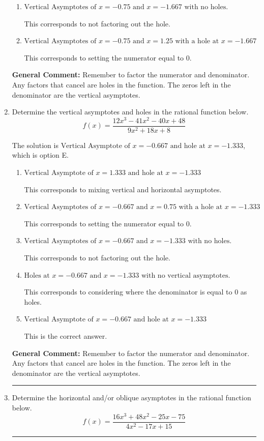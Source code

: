 \documentclass{extbook}[14pt]
\newcommand{\litem}[1]{\item #1

\rule{\textwidth}{0.4pt}}
\begin{document}
\begin{enumerate}
{\begin{enumerate}[label=\Alph*.]
This corresponds to mixing vertical and horizontal asymptotes.
\item \( \text{Vertical Asymptotes of } x = -0.75 \text{ and } x = -1.667 \text{ with no holes.} \)

This corresponds to not factoring out the hole.
\item \( \text{Vertical Asymptotes of } x = -0.75 \text{ and } x = 1.25 \text{ with a hole at } x = -1.667 \)

This corresponds to setting the numerator equal to 0.
\end{enumerate}

\textbf{General Comment:} Remember to factor the numerator and denominator. Any factors that cancel are holes in the function. The zeros left in the denominator are the vertical asymptotes.
}
\litem{
Determine the vertical asymptotes and holes in the rational function below.
\[ f(x) = \frac{12x^{3} -41 x^{2} -40 x + 48}{9x^{2} +18 x + 8} \]

The solution is \( \text{Vertical Asymptote of } x = -0.667 \text{ and hole at } x = -1.333 \), which is option E.\begin{enumerate}[label=\Alph*.]
\item \( \text{Vertical Asymptote of } x = 1.333 \text{ and hole at } x = -1.333 \)

This corresponds to mixing vertical and horizontal asymptotes.
\item \( \text{Vertical Asymptotes of } x = -0.667 \text{ and } x = 0.75 \text{ with a hole at } x = -1.333 \)

This corresponds to setting the numerator equal to 0.
\item \( \text{Vertical Asymptotes of } x = -0.667 \text{ and } x = -1.333 \text{ with no holes.} \)

This corresponds to not factoring out the hole.
\item \( \text{Holes at } x = -0.667 \text{ and } x = -1.333 \text{ with no vertical asymptotes.} \)

This corresponds to considering where the denominator is equal to 0 as holes.
\item \( \text{Vertical Asymptote of } x = -0.667 \text{ and hole at } x = -1.333 \)

This is the correct answer.
\end{enumerate}

\textbf{General Comment:} Remember to factor the numerator and denominator. Any factors that cancel are holes in the function. The zeros left in the denominator are the vertical asymptotes.
}
\litem{
Determine the horizontal and/or oblique asymptotes in the rational function below.
\[ f(x) = \frac{16x^{3} +48 x^{2} -25 x -75}{4x^{2} -17 x + 15} \]

}
\end{enumerate}
\end{document}
